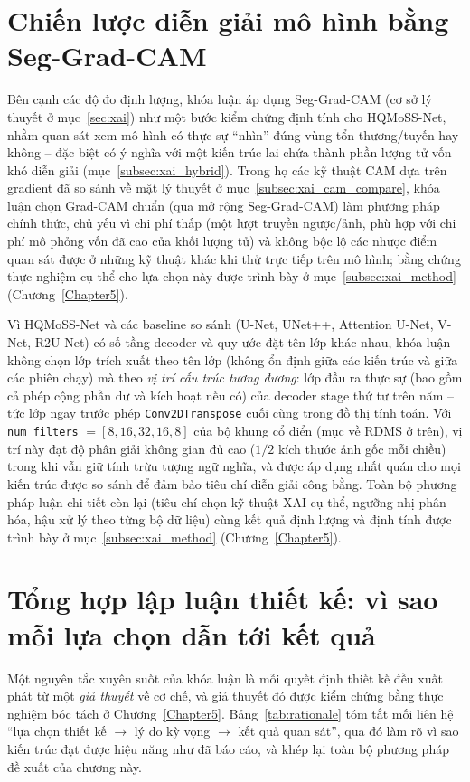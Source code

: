 \section{Chiến lược diễn giải mô hình bằng Seg-Grad-CAM}
\label{sec:xai_strategy}
Bên cạnh các độ đo định lượng, khóa luận áp dụng Seg-Grad-CAM (cơ sở lý thuyết ở mục~\ref{sec:xai}) như một bước kiểm chứng định tính cho HQMoSS-Net, nhằm quan sát xem mô hình có thực sự ``nhìn'' đúng vùng tổn thương/tuyến hay không -- đặc biệt có ý nghĩa với một kiến trúc lai chứa thành phần lượng tử vốn khó diễn giải (mục~\ref{subsec:xai_hybrid}). Trong họ các kỹ thuật CAM dựa trên gradient đã so sánh về mặt lý thuyết ở mục~\ref{subsec:xai_cam_compare}, khóa luận chọn Grad-CAM chuẩn (qua mở rộng Seg-Grad-CAM) làm phương pháp chính thức, chủ yếu vì chi phí thấp (một lượt truyền ngược/ảnh, phù hợp với chi phí mô phỏng vốn đã cao của khối lượng tử) và không bộc lộ các nhược điểm quan sát được ở những kỹ thuật khác khi thử trực tiếp trên mô hình; bằng chứng thực nghiệm cụ thể cho lựa chọn này được trình bày ở mục~\ref{subsec:xai_method} (Chương~\ref{Chapter5}).

Vì HQMoSS-Net và các baseline so sánh (U-Net, UNet++, Attention U-Net, V-Net, R2U-Net) có số tầng decoder và quy ước đặt tên lớp khác nhau, khóa luận không chọn lớp trích xuất theo tên lớp (không ổn định giữa các kiến trúc và giữa các phiên chạy) mà theo \emph{vị trí cấu trúc tương đương}: lớp đầu ra thực sự (bao gồm cả phép cộng phần dư và kích hoạt nếu có) của decoder stage thứ tư trên năm -- tức lớp ngay trước phép \texttt{Conv2DTranspose} cuối cùng trong đồ thị tính toán. Với \texttt{num\_filters} $=[8,16,32,16,8]$ của bộ khung cổ điển (mục về RDMS ở trên), vị trí này đạt độ phân giải không gian đủ cao ($1/2$ kích thước ảnh gốc mỗi chiều) trong khi vẫn giữ tính trừu tượng ngữ nghĩa, và được áp dụng nhất quán cho mọi kiến trúc được so sánh để đảm bảo tiêu chí diễn giải công bằng. Toàn bộ phương pháp luận chi tiết còn lại (tiêu chí chọn kỹ thuật XAI cụ thể, ngưỡng nhị phân hóa, hậu xử lý theo từng bộ dữ liệu) cùng kết quả định lượng và định tính được trình bày ở mục~\ref{subsec:xai_method} (Chương~\ref{Chapter5}).

\section{Tổng hợp lập luận thiết kế: vì sao mỗi lựa chọn dẫn tới kết quả}
\label{sec:design_rationale}
Một nguyên tắc xuyên suốt của khóa luận là mỗi quyết định thiết kế đều xuất phát từ một \emph{giả thuyết} về cơ chế, và giả thuyết đó được kiểm chứng bằng thực nghiệm bóc tách ở Chương~\ref{Chapter5}. Bảng~\ref{tab:rationale} tóm tắt mối liên hệ ``lựa chọn thiết kế $\rightarrow$ lý do kỳ vọng $\rightarrow$ kết quả quan sát'', qua đó làm rõ vì sao kiến trúc đạt được hiệu năng như đã báo cáo, và khép lại toàn bộ phương pháp đề xuất của chương này.

